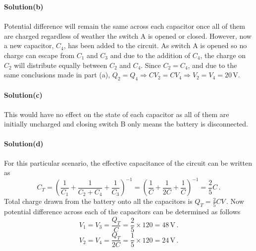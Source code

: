 \documentclass{article}
\begin{document}
\textbf{Solution(b)}
\\
\\Potential difference will remain the same across each capacitor once all of them are charged regardless of weather the switch A is opened or closed. However, now a new capacitor, $C_4$, has been added to the circuit. As switch A is opened so no charge can escape from $C_1$ and $C_3$ and due to the addition of $C_4$, the charge on $C_2$ will distribute equally between $C_2$ and $C_4$. Since $C_2=C_4$, and due to the same conclusions made in part (a), $Q_2=Q_4\Rightarrow CV_2=CV_4\Rightarrow V_2=V_4=20\,\text{V}$. 
\\
\\\textbf{Solution(c)}
\\
\\This would have no effect on the state of each capacitor as all of them are initially uncharged and closing switch B only means the battery is disconnected.
\\
\\\textbf{Solution(d)}
\\
\\For this particular scenario, the effective capacitance of the circuit can be written as
\[C_T=\left(\frac{1}{C_1}+\frac{1}{C_2+C_4}+\frac{1}{C_3}\right)^{-1}=\left(\frac{1}{C}+\frac{1}{2C}+\frac{1}{C}\right)^{-1}=\frac{2}{5}C\,.\]
Total charge drawn from the battery onto all the capacitors is $Q_T=\frac{2}{5}CV$\,.
Now potential difference across each of the capacitors can be determined as follows
\[V_1=V_3=\frac{Q_T}{C}=\frac{2}{5}\times120=48\,\text{V}\,.\]
\[V_2=V_4=\frac{Q_T}{2C}=\frac{1}{5}\times120=24\,\text{V}\,.\]

\newpage
\end{document}
